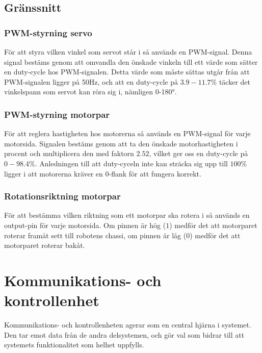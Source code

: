 \documentclass[a4paper,11pt]{article}
\begin{document}
\subsection{Gränssnitt} \label{ssec:controlInterface}

\subsubsection{PWM-styrning servo}
För att styra vilken vinkel som servot står i så används en PWM-signal. Denna signal bestäms genom att omvandla den önskade vinkeln till ett värde som sätter en duty-cycle hos PWM-signalen. Detta värde som måste sättas utgår från att PWM-signalen ligger på 50Hz, och att en duty-cycle på $3.9-11.7\%$ täcker det vinkelspann som servot kan röra sig i, nämligen 0-180\si{\degree}.  

\subsubsection{PWM-styrning motorpar}
För att reglera hastigheten hos motorerna så används en PWM-signal för varje motorsida. Signalen bestäms genom att ta den önskade motorhastigheten i procent och multiplicera den med faktorn $2.52$, vilket ger oss en duty-cycle på $0-98.4\%$. Anledningen till att duty-cyceln inte kan sträcka sig upp till $100\%$ ligger i att motorerna kräver en 0-flank för att fungera korrekt. 

\subsubsection{Rotationsriktning motorpar}
För att bestämma vilken riktning som ett motorpar ska rotera i så används en output-pin för varje motorsida. Om pinnen är hög ($1$) medför det att motorparet roterar framåt sett till robotens chassi, om pinnen är låg ($0$) medför det att motorparet roterar bakåt.

\clearpage
\section{Kommunikations- och kontrollenhet} \label{sec:system3}
Kommunikations- och kontrollenheten agerar som en central hjärna i systemet. Den tar emot data från de andra delsystemen, och gör val som bidrar till att systemets funktionalitet som helhet uppfylls.
\end{document}
